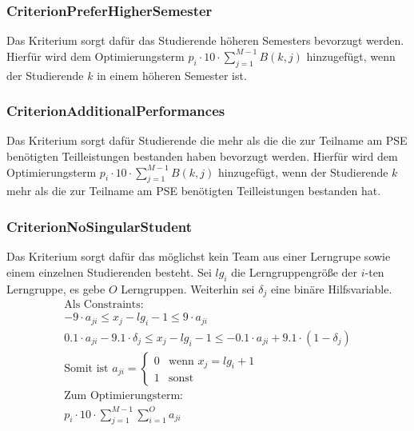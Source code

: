 \documentclass[parskip=full]{scrartcl}
\begin{document}
\subsubsection{CriterionPreferHigherSemester}
Das Kriterium sorgt dafür das Studierende höheren Semesters bevorzugt werden.
Hierfür wird dem Optimierungsterm $p_i \cdot 10 \cdot \sum_{j = 1}^{M-1} B(k,j)$ hinzugefügt, wenn der
Studierende $k$ in einem höheren Semester ist.
\subsubsection{CriterionAdditionalPerformances}
Das Kriterium sorgt dafür Studierende die mehr als die die zur Teilname am PSE
benötigten Teilleistungen bestanden haben bevorzugt werden. Hierfür wird dem Optimierungsterm
$p_i \cdot 10 \cdot \sum_{j = 1}^{M-1} B(k,j)$ hinzugefügt, wenn der Studierende
$k$ mehr als die zur Teilname am PSE benötigten Teilleistungen bestanden hat.
\subsubsection{CriterionNoSingularStudent}
Das Kriterium sorgt dafür das möglichst kein Team aus einer Lerngrupe sowie
einem einzelnen Studierenden besteht.
Sei $lg_i$ die Lerngruppengröße der $i$-ten Lerngruppe, es gebe $O$ Lerngruppen.
Weiterhin sei $\delta_j$ eine binäre Hilfsvariable.
\begin{gather*}
\text{Als Constraints:} \\
-9 \cdot a_{ji} \le x_j -lg_i -1 \le 9\cdot a_{ji}\\
0.1 \cdot a_{ji} - 9.1 \cdot \delta_j \le x_j -lg_i -1 \le -0.1 \cdot a_{ji} +
9.1 \cdot (1-\delta_j)\\
\text{Somit ist } a_{ji} = \begin{cases}
    0 & \text{wenn $x_j = lg_i +1$} \\
    1 & \text{sonst} 
    \end{cases}\\
\text{Zum Optimierungsterm: }\\
p_i \cdot 10 \cdot \sum_{j = 1}^{M-1} \sum_{i = 1}^{O}a_{ji}
\end{gather*}
\end{document}
